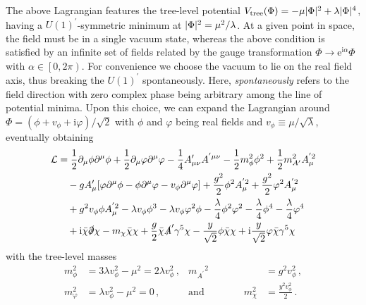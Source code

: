 The above Lagrangian features the tree-level potential $V_\text{tree}(\Phi) = - \mu \lvert\Phi\rvert^2 + \lambda \lvert\Phi\rvert^4$, having a  $U(1)^\prime$-symmetric minimum at $\lvert\Phi\rvert^2 = \mu^2 / \lambda$. At a given point in space, the field must be in a single vacuum state, whereas the above condition is satisfied by an infinite set of fields related by the gauge transformation $\Phi \rightarrow \mathrm{e}^{\mathrm{i} \alpha} \Phi$ with $\alpha \in \left[0, 2\pi \right)$. For convenience we choose the vacuum to lie on the real field axis, thus breaking the $U(1)^\prime$ spontaneously. Here, \textit{spontaneously} refers to the field direction with zero complex phase being arbitrary among the line of potential minima. Upon this choice, we can expand the Lagrangian around $\Phi = (\phi + v_\phi +  \mathrm{i} \varphi)/\sqrt{2}$ with $\phi$ and $\varphi$ being real fields and $v_\phi \equiv \mu / \sqrt{\lambda}$, eventually obtaining
\begin{align}
	\mathcal{L} &=  \frac{1}{2}\partial_\mu \phi \partial^\mu \phi + \frac{1}{2} \partial_\mu\varphi \partial^\mu\varphi - \frac{1}{4} A'_{\mu\nu}A^{'\mu\nu}
	- \frac{1}{2} m_\phi^2\phi^2 + \frac{1}{2}m_{A'}^2A^{'2}_\mu  \notag \\
	&\quad -gA'_\mu[\varphi\partial^\mu\phi - \phi\partial^\mu\varphi - v_{\phi}\partial^\mu\varphi] + \frac{g^2}{2}\phi^2A^{'2}_\mu + \frac{g^2}{2}\varphi^2 A^{'2}_\mu \nonumber \\
	&\quad  + g^2v_{\phi}\phi A^{'2}_\mu -\lambda v_{\phi}\phi^3 - \lambda v_{\phi}\varphi^2\phi - \frac{\lambda}{4}\phi^2\varphi^2 - \frac{\lambda}{4}\phi^4 -\frac{\lambda}{4} \varphi^4\notag\\
	&\quad  +\mathrm{i}\bar\chi\slashed{\partial}\chi - m_\chi\bar\chi\chi + \frac{g}{2}\bar\chi\slashed{A}'\gamma^5\chi -
	\frac{y}{\sqrt{2}}\phi\bar\chi\chi + \mathrm{i}\frac{y}{\sqrt{2}}\varphi\bar\chi\gamma^5\chi 
\end{align}
with the tree-level masses
\begin{subequations}
	\begin{align}
		m_\phi^2 &= 3 \lambda v_\phi^2 - \mu^2 = 2 \lambda v_\phi^2 \, , &  {m_{A^\prime}}^2 &= g^2 v_\phi^2 \, , \\
		m_\varphi^2 &= \lambda v_\phi^2 - \mu^2 = 0 \, ,
		 &\text{and} \qquad \qquad m_\chi^2 &= \frac{y^2 v_\phi^2}{2} \, .
		 \label{eq:masses}
	\end{align}
\end{subequations}


